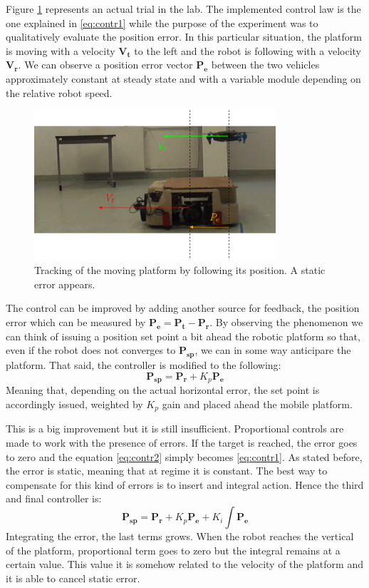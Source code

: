 Figure \ref{figure:nogain} represents an actual trial in the lab. The implemented control law is the one explained in \ref{eq:contr1} while the purpose of the experiment was to qualitatively evaluate the position error. In this particular situation, the platform is moving with a velocity $\boldsymbol{V_t}$ to the left and the robot is following with a velocity $\boldsymbol{V_r}$. We can observe a position error vector $\boldsymbol{P_e}$ between the two vehicles approximately constant at steady state and with a variable module depending on the relative robot speed.
\begin{figure}[h]
 \centering
   \includegraphics[width = 0.8\textwidth ]{tracknogain2.eps}
    \caption[Tracking with no gain]{Tracking of the moving platform by following its position. A static error appears.}
   \label{figure:nogain}
\end{figure}
The control can be improved by adding  another source for feedback, the position error which can be measured by $\boldsymbol{P_e} = \boldsymbol{P_{t}} - \boldsymbol{P_{r}}$. By observing the phenomenon we can think of issuing a position set point a bit ahead the robotic platform so that, even if the robot does not converges to $\boldsymbol{P_{sp}}$, we can in some way anticipare the platform. That said, the controller is modified to the following:
\begin{equation}
\boldsymbol{P_{sp}} = \boldsymbol{P_{r}} + K_p \boldsymbol{P_e} 
\label{eq:contr2}
\end{equation}
Meaning that, depending on the actual horizontal error, the set point is accordingly issued, weighted by $K_p$ gain and placed ahead the mobile platform. 

This is a big improvement but it is still insufficient. Proportional controls are made to work with the presence of errors. If the target is reached, the error goes to zero and the equation \ref{eq:contr2} simply becomes \ref{eq:contr1}. As stated before, the error is static, meaning that at regime it is constant. The best way to compensate for this kind of errors is to insert and integral action. Hence the third and final controller is:
\begin{equation}
\boldsymbol{P_{sp}} = \boldsymbol{P_{r}} + K_p \boldsymbol{P_e} +  K_i \int \boldsymbol{P_e}
\label{eq:contr3}
\end{equation}
Integrating the error, the last terms grows. When the robot reaches the vertical of the platform, proportional term goes to zero but the integral remains at a certain value. This value it is somehow related to the velocity of the platform and it is able to cancel static error.


